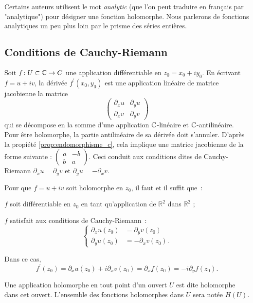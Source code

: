 \begin{rem}
Certains auteurs utilisent le mot \textit{analytic} (que l'on peut traduire en français par "analytique") pour désigner une fonction holomorphe. Nous parlerons de fonctions analytiques un peu plus loin par le prisme des séries entières.
\end{rem}

\subsection{Conditions de Cauchy-Riemann}
Soit $f \colon U \subset \mathbb{C} \to C$ une application différentiable en $z_0=x_0 +i y_0$. En écrivant $f=u + i v$, la dérivée $f^\prime (x_0,y_0)$ est une application linéaire de matrice jacobienne la matrice
\[\begin{pmatrix} \partial_x u &  \partial_y u \\ \partial_x v &  \partial_y v \end{pmatrix} \]
qui se décompose en la somme d'une application $\mathbb{C}$-linéaire et $\mathbb{C}$-antilinéaire. Pour être holomorphe, la partie antilinéaire de sa dérivée doit s'annuler. D'après la propiété \ref{prop:endomorphisme_c}, cela implique une matrice jacobienne de la forme suivante : $\begin{pmatrix} a &  -b  \\ b &  a \end{pmatrix}$. Ceci conduit aux conditions dites de Cauchy-Riemann $\partial_x u=\partial_y v$ et $\partial_y u=-\partial_x v$.

\begin{fprop}\label{prop:hol_1}
Pour que $f=u + i v$ soit holomorphe en $z_0$, il faut et il suffit que~:
\begin{MYenumerate}
\item $f$ soit différentiable en $z_0$ en tant qu'application de $\mathbb{R}^2$ dans $\mathbb{R}^2$ ;
\item $f$ satisfait aux conditions de Cauchy-Riemann~:
\[\begin{cases}
\partial_x u(z_0) &= \partial_y v(z_0)  \\
\partial_y u(z_0) &= - \partial_x v(z_0).
\end{cases}\]
\end{MYenumerate}
Dans ce cas, 
\[f^\prime(z_0)=\partial_x u(z_0) + i \partial_x v(z_0) = \partial_x f(z_0)=-i \partial_y f(z_0).  \]
\end{fprop}

\begin{fdefn}
Une application holomorphe en tout point d'un ouvert $U$ est dite holomorphe dans cet ouvert. L'ensemble des fonctions holomorphes dans $U$ sera notée $H(U)$.
\end{fdefn}


